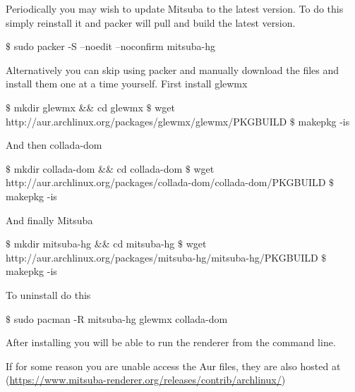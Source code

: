 Periodically you may wish to update Mitsuba to the latest version.
To do this simply reinstall it and packer will pull and build the latest version.
\begin{shell}
$\text{\$}$ sudo packer -S --noedit --noconfirm mitsuba-hg
\end{shell}

Alternatively you can skip using packer and manually download the files and install them one at a time yourself.
First install glewmx
\begin{shell}
$\text{\$}$ mkdir glewmx && cd glewmx
$\text{\$}$ wget http://aur.archlinux.org/packages/glewmx/glewmx/PKGBUILD
$\text{\$}$ makepkg -is
\end{shell}

And then collada-dom
\begin{shell}
$\text{\$}$ mkdir collada-dom && cd collada-dom
$\text{\$}$ wget http://aur.archlinux.org/packages/collada-dom/collada-dom/PKGBUILD
$\text{\$}$ makepkg -is
\end{shell}

And finally Mitsuba
\begin{shell}
$\text{\$}$ mkdir mitsuba-hg && cd mitsuba-hg
$\text{\$}$ wget http://aur.archlinux.org/packages/mitsuba-hg/mitsuba-hg/PKGBUILD
$\text{\$}$ makepkg -is
\end{shell}

To uninstall do this
\begin{shell}
$\text{\$}$ sudo pacman -R mitsuba-hg glewmx collada-dom
\end{shell}

After installing you will be able to run the renderer from the command line.

If for some reason you are unable access the Aur files, they are also hosted at (\url{https://www.mitsuba-renderer.org/releases/contrib/archlinux/})


